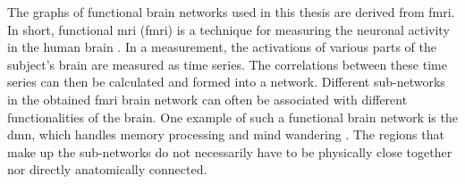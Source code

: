 The graphs of functional brain networks used in this thesis are derived from \acrshort{fmri}. In short, functional \acrshort{mri} (\acrshort{fmri}) is a technique for measuring the neuronal activity in the human brain \cite{sporns}. In a measurement, the activations of various parts of the subject's brain are measured as time series. The correlations between these time series can then be calculated and formed into a network. Different sub-networks in the obtained \acrshort{fmri} brain network can often be associated with different functionalities of the brain. One example of such a functional brain network is the \acrfull{dmn}, which handles memory processing and mind wandering  \cite{alves_dmn}. The regions that make up the sub-networks do not necessarily have to be physically close together nor directly anatomically connected.




